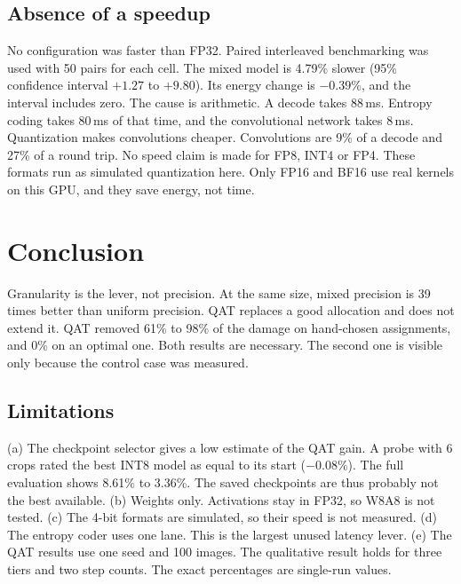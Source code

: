 \documentclass[10pt,twocolumn]{article}
\begin{document}
\subsection{Absence of a speedup}
No configuration was faster than FP32. Paired interleaved benchmarking was used with 50 pairs for each
cell. The mixed model is 4.79\% slower (95\% confidence interval $+1.27$ to $+9.80$). Its energy change
is $-0.39\%$, and the interval includes zero.
The cause is arithmetic. A decode takes 88\,ms. Entropy coding takes 80\,ms of that time, and the
convolutional network takes 8\,ms. Quantization makes convolutions cheaper. Convolutions are 9\% of a
decode and 27\% of a round trip.
No speed claim is made for FP8, INT4 or FP4. These formats run as simulated quantization here. Only FP16
and BF16 use real kernels on this GPU, and they save energy, not time.

\section{Conclusion}
Granularity is the lever, not precision. At the same size, mixed precision is 39 times better than
uniform precision. QAT replaces a good allocation and does not extend it. QAT removed 61\% to 98\% of
the damage on hand-chosen assignments, and 0\% on an optimal one. Both results are necessary. The second
one is visible only because the control case was measured.

\subsection*{Limitations}
(a) The checkpoint selector gives a low estimate of the QAT gain. A probe with 6 crops rated the best
INT8 model as equal to its start ($-0.08\%$). The full evaluation shows 8.61\% to 3.36\%. The saved
checkpoints are thus probably not the best available.
(b) Weights only. Activations stay in FP32, so W8A8 is not tested.
(c) The 4-bit formats are simulated, so their speed is not measured.
(d) The entropy coder uses one lane. This is the largest unused latency lever.
(e) The QAT results use one seed and 100 images. The qualitative result holds for three tiers and two
step counts. The exact percentages are single-run values.
\end{document}
